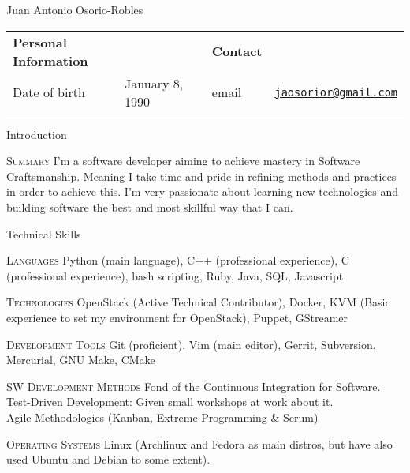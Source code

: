 \documentclass[english,10pt,letterpaper]{article}
\begin{document}
\centering
\begin{cv}{Juan Antonio Osorio-Robles}

	\begin{table}[h]
		\begin{tabular}{@{} l l p{0.5cm} l r}
			{\bf Personal Information}	&	&	&	{\bf Contact}	&\\
			Date of birth &	January 8, 1990	&	&
			email & \href{mailto:jaosorior@gmail.com}{\tt jaosorior@gmail.com}\\
		\end{tabular}
	\end{table}

	\begin{cvlist}{Introduction}
        \item[\textsc{Summary}]
            I'm a software developer aiming to achieve mastery in Software
            Craftsmanship. Meaning I take time and pride in refining
            methods and practices in order to achieve this. I'm very passionate
            about learning new technologies and building software the best and
            most skillful way that I can.
	\end{cvlist}


	\begin{cvlist}{Technical Skills}
			\item [\textsc{Languages}]
                Python (main language), C++ (professional experience), C
                (professional experience), bash scripting, Ruby, Java, SQL,
                Javascript
                
			\item [\textsc{Technologies}]
                OpenStack (Active Technical Contributor), Docker,
                KVM (Basic experience to set my environment for OpenStack),
                Puppet, GStreamer
			\item [\textsc{Development Tools}]
                Git (proficient), Vim (main editor), Gerrit, Subversion,
                Mercurial, GNU Make, CMake
			\item [\textsc{SW Development Methods}]
				Fond of the Continuous Integration for Software.\\
                Test-Driven Development: Given small workshops at work about
                it.\\
                Agile Methodologies (Kanban, Extreme Programming \& Scrum)
			\item [\textsc{Operating Systems}]
                Linux (Archlinux and Fedora as main distros, but have also
                used Ubuntu and Debian to some extent).
	\end{cvlist}


\end{cv}
\end{document}
